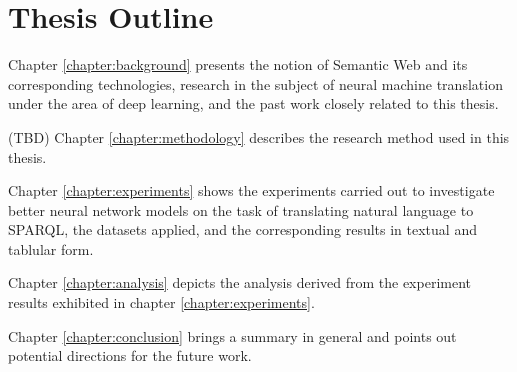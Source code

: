 \section{Thesis Outline} \label{section:thesis outline}

Chapter \ref{chapter:background} presents the notion of Semantic Web and its corresponding technologies, research in the subject of neural machine translation under the area of deep learning, and the past work closely related to this thesis. 

(TBD) Chapter \ref{chapter:methodology} describes the research method used in this thesis.

Chapter \ref{chapter:experiments} shows the experiments carried out to investigate better neural network models on the task of translating natural language to SPARQL, the datasets applied, and the corresponding results in textual and tablular form.

Chapter \ref{chapter:analysis} depicts the analysis derived from the experiment results exhibited in chapter \ref{chapter:experiments}.

Chapter \ref{chapter:conclusion} brings a summary in general and points out potential directions for the future work.